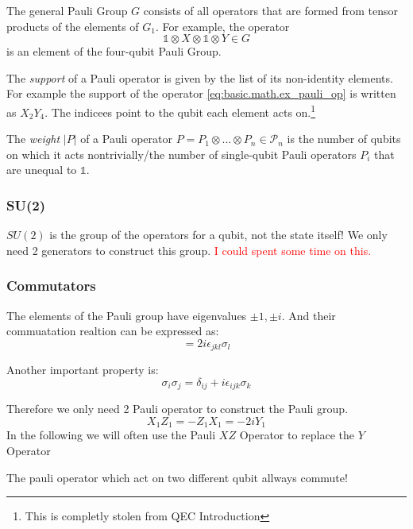 The general Pauli Group $G$ consists of all operators that are formed from tensor products of the elements of $G_1$. 
For example, the operator
\begin{equation}
    \mathds{1} \otimes X \otimes \mathds{1} \otimes Y \in G
    \label{eq:basic.math.ex_pauli_op}
\end{equation}
is an element of the four-qubit Pauli Group. 

The \textit{support} of a Pauli operator is given by the list of its non-identity elements.
For example the support of the operator \ref{eq:basic.math.ex_pauli_op} is written as $X_2Y_4$.
The indicees point to the qubit each element acts on.\footnote{This is completly stolen from QEC Introduction} \cite{QECintro}

The \textit{weight} $|P|$ of a Pauli operator $P=P_1 \otimes... \otimes P_n \in \mathcal{P}_n $ is 
the number of qubits on which it acts nontrivially/the number of single-qubit Pauli operators 
$P_i$ that are unequal to $\mathds{1}$. \cite{QECmemory}

\subsubsection{SU(2)}
$SU(2)$ is the group of the operators for a qubit, not the state itself!
We only need 2 generators to construct this group.
\textcolor{red}{I could spent some time on this.}


\subsubsection{Commutators}
The elements of the Pauli group have eigenvalues ${\pm 1,\pm i}$.
And their commuatation realtion can be expressed as:
\begin{equation}
    [\sigma_j,\sigma_k] = 2 i \epsilon_{jkl} \sigma_l
\end{equation}

Another important property is:
\begin{equation}
    \sigma_i \sigma_j = \delta_{ij} + i \epsilon_{ijk} \sigma_k
\end{equation}

Therefore we only need 2 Pauli operator to construct the Pauli group.
\begin{equation}
    X_1 Z_1 = - Z_1 X_1 = -2 i Y_1
\end{equation}
In the following we will often use the Pauli $XZ$ Operator to replace the $Y$ Operator 

The pauli operator which act on two different qubit allways commute!

